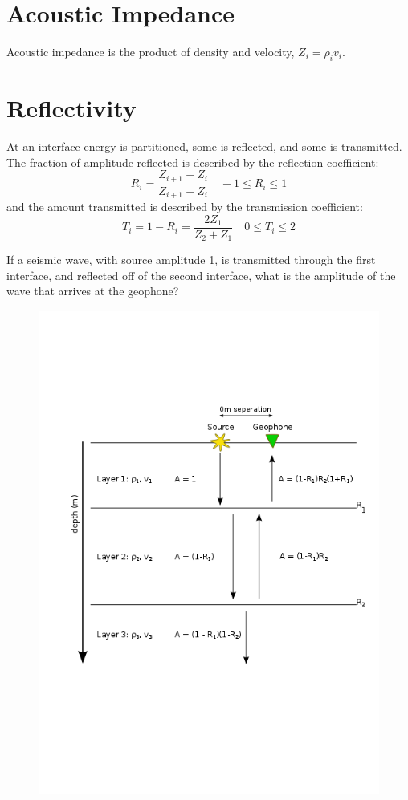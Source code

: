 \documentclass{article}[11pt,oneside]
\begin{document}
\section*{Acoustic Impedance}

Acoustic impedance is the product of density and velocity, $Z_i = \rho_i v_i$.

\section*{Reflectivity}
At an interface energy is partitioned, some is reflected, and some is transmitted. The fraction of amplitude reflected is described by the reflection coefficient:
$$R_i = \frac{Z_{i+1} - Z_i}{Z_{i+1}+Z_i} \quad -1 \leq R_i \leq 1$$
and the amount transmitted is described by the transmission coefficient:
$$T_i = 1-R_i = \frac{2Z_1}{Z_2+Z_1} \quad 0 \leq T_i \leq 2$$

If a seismic wave, with source amplitude 1, is transmitted through the first interface, and reflected off of the second interface, what is the amplitude of the wave that arrives at the geophone?

\begin{figure}[H]
	\centering \includegraphics[width=\textwidth]{Amplitude.png}
\end{figure}
\end{document}
